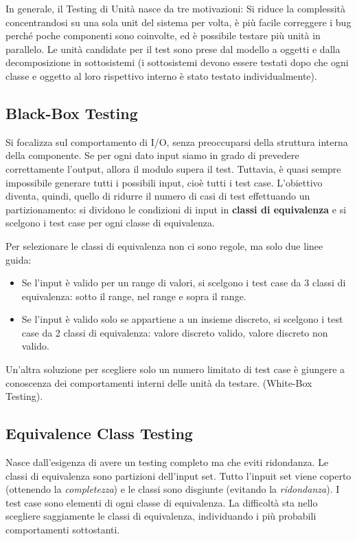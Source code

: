         In generale, il Testing di Unità nasce da tre motivazioni: Si riduce la complessità concentrandosi su una sola unit del sistema per volta, è più facile correggere i bug perché poche componenti sono coinvolte, ed è possibile testare più unità in parallelo. Le unità candidate per il test sono prese dal modello a oggetti e dalla decomposizione in sottosistemi (i sottosistemi devono essere testati dopo che ogni classe e oggetto al loro rispettivo interno è stato testato individualmente).
        
        \subsection{Black-Box Testing}
            Si focalizza sul comportamento di I/O, senza preoccuparsi della struttura interna della componente. Se per ogni dato input siamo in grado di prevedere correttamente l'output, allora il modulo supera il test. Tuttavia, è quasi sempre impossibile generare tutti i possibili input, cioè tutti i test case. L'obiettivo diventa, quindi, quello di ridurre il numero di casi di test effettuando un partizionamento: si dividono le condizioni di input in \textbf{classi di equivalenza} e si scelgono i test case per ogni classe di equivalenza.
            
            Per selezionare le classi di equivalenza non ci sono regole, ma solo due linee guida:
            \begin{itemize}
                \item Se l'input è valido per un range di valori, si scelgono i test case da 3 classi di equivalenza: sotto il range, nel range e sopra il range.
                \item Se l'input è valido solo se appartiene a un insieme discreto, si scelgono i test case da 2 classi di equivalenza: valore discreto valido, valore discreto non valido.
            \end{itemize}
            
            Un'altra soluzione per scegliere solo un numero limitato di test case è giungere a conoscenza dei comportamenti interni delle unità da testare. (White-Box Testing).
            
        \subsection{Equivalence Class Testing}
            Nasce dall'esigenza di avere un testing completo ma che eviti ridondanza. Le classi di equivalenza sono partizioni dell'input set. Tutto l'inpuit set viene coperto (ottenendo la \textit{completezza}) e le classi sono disgiunte (evitando la \textit{ridondanza}). I test case sono elementi di ogni classe di equivalenza. La difficoltà sta nello scegliere saggiamente le classi di equivalenza, individuando i più probabili comportamenti sottostanti.
            

